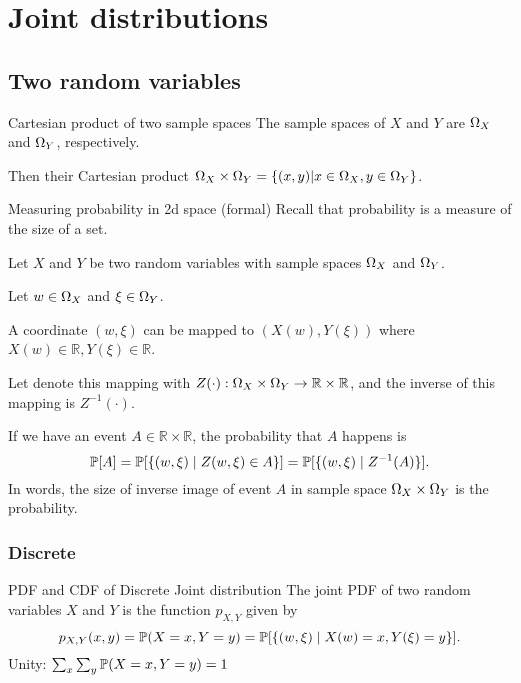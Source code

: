 \section{Joint distributions}

\subsection{Two random variables}

\begin{fact}{Cartesian product of two sample spaces}{}
    The sample spaces of $X$ and $Y$ are $\Omega_X$ and $\Omega_Y$, respectively.
    
    Then their Cartesian product $\Omega_X\times\Omega_Y = \{(x,y)|x\in\Omega_X, y\in\Omega_Y\}$.
\end{fact}

\begin{fact}{Measuring probability in 2d space (formal)}{}
    Recall that probability is a measure of the size of a set.
    
    Let $X$ and $Y$ be two random variables with sample spaces $\Omega_X$ and $\Omega_Y$.
    
    Let $w\in\Omega_X$ and $\xi\in\Omega_Y$.
    
    A coordinate $(w,\xi)$ can be mapped to $(X(w),Y(\xi))$ where $X(w)\in\mathbb{R},Y(\xi)\in\mathbb{R}$.
    
    Let denote this mapping with $Z(\cdot): \Omega_X\times\Omega_Y\rightarrow\mathbb{R}\times\mathbb{R}$, and the inverse of this mapping is $Z^{-1}(\cdot)$.
    
    If we have an event $A\in\mathbb{R}\times\mathbb{R}$, the probability that $A$ happens is
    \begin{equation*}
        \mathbb{P}[A]=\mathbb{P}[\{(w,\xi) \mid Z(w,\xi)\in A\}] = \mathbb{P}[\{(w,\xi) \mid Z^{-1}(A)\} ].
    \end{equation*}
    In words, the size of inverse image of event $A$ in sample space $\Omega_X\times\Omega_Y$ is the probability.
\end{fact}

\subsubsection{Discrete}

\begin{fact}{PDF and CDF of Discrete Joint distribution}{}
    The joint PDF of two random variables $X$ and $Y$ is the function $p_{X,Y}$ given by
    \begin{equation*}
        p_{X,Y}(x,y) = \mathbb{P}(X=x,Y=y) = \mathbb{P}[\{ (w,\xi) \mid X(w) =x, Y(\xi) = y\}].
    \end{equation*}
    Unity: $ \sum_x \sum_y \mathbb{P}(X=x,Y=y) = 1$
\end{fact}

